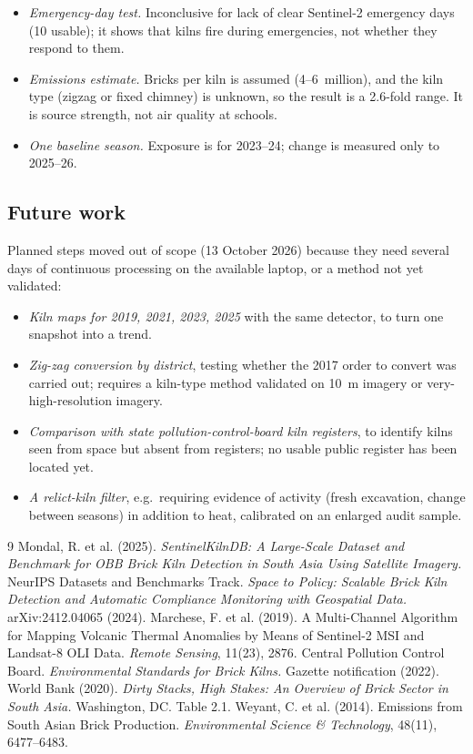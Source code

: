 \documentclass[11pt,a4paper]{article}
\begin{document}
\begin{itemize}[leftmargin=*]
this imagery and is not used.
\item \emph{Emergency-day test.} Inconclusive for lack of clear Sentinel-2
emergency days (10 usable); it shows that kilns fire during emergencies, not
whether they respond to them.
\item \emph{Emissions estimate.} Bricks per kiln is assumed (4--6~million), and
the kiln type (zigzag or fixed chimney) is unknown, so the result is a 2.6-fold
range. It is source strength, not air quality at schools.
\item \emph{One baseline season.} Exposure is for 2023--24; change is measured
only to 2025--26.
\end{itemize}

\subsection*{Future work}
Planned steps moved out of scope (13 October 2026) because they need several days
of continuous processing on the available laptop, or a method not yet
validated:
\begin{itemize}[leftmargin=*]
\item \emph{Kiln maps for 2019, 2021, 2023, 2025} with the same detector, to turn
one snapshot into a trend.
\item \emph{Zig-zag conversion by district}, testing whether the 2017 order to
convert was carried out; requires a kiln-type method validated on 10~m imagery
or very-high-resolution imagery.
\item \emph{Comparison with state pollution-control-board kiln registers}, to
identify kilns seen from space but absent from registers; no usable public
register has been located yet.
\item \emph{A relict-kiln filter}, e.g.\ requiring evidence of activity
(fresh excavation, change between seasons) in addition to heat, calibrated on
an enlarged audit sample.
\end{itemize}

\begin{thebibliography}{9}
 Mondal, R. et al. (2025). \emph{SentinelKilnDB: A Large-Scale
Dataset and Benchmark for OBB Brick Kiln Detection in South Asia Using Satellite
Imagery.} NeurIPS Datasets and Benchmarks Track.
 \emph{Space to Policy: Scalable Brick Kiln Detection and
Automatic Compliance Monitoring with Geospatial Data.} arXiv:2412.04065 (2024).
 Marchese, F. et al. (2019). A Multi-Channel Algorithm for
Mapping Volcanic Thermal Anomalies by Means of Sentinel-2 MSI and Landsat-8 OLI
Data. \emph{Remote Sensing}, 11(23), 2876.
 Central Pollution Control Board. \emph{Environmental Standards
for Brick Kilns.} Gazette notification (2022).
 World Bank (2020). \emph{Dirty Stacks, High Stakes: An
Overview of Brick Sector in South Asia.} Washington, DC. Table 2.1.
 Weyant, C. et al. (2014). Emissions from South Asian Brick
Production. \emph{Environmental Science \& Technology}, 48(11), 6477--6483.
\end{thebibliography}
\end{document}
